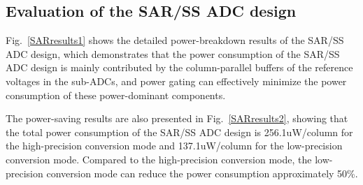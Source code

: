 \subsection{Evaluation of the SAR/SS ADC design}\label{SAR power}


Fig.~\ref{SARresults1} shows the detailed power-breakdown results of the SAR/SS ADC design, which 
demonstrates that the power consumption of the SAR/SS ADC design is mainly contributed by the column-parallel buffers of the reference voltages in the sub-ADCs, and power gating can effectively minimize the power consumption of these 
power-dominant components. 

The power-saving results are also presented in Fig.~\ref{SARresults2}, showing that the total power consumption of the SAR/SS ADC design is 256.1uW/column for the high-precision conversion mode and 137.1uW/column for the low-precision conversion mode. 
Compared to the high-precision conversion mode, the low-precision conversion mode can reduce the power consumption approximately 50\%.

